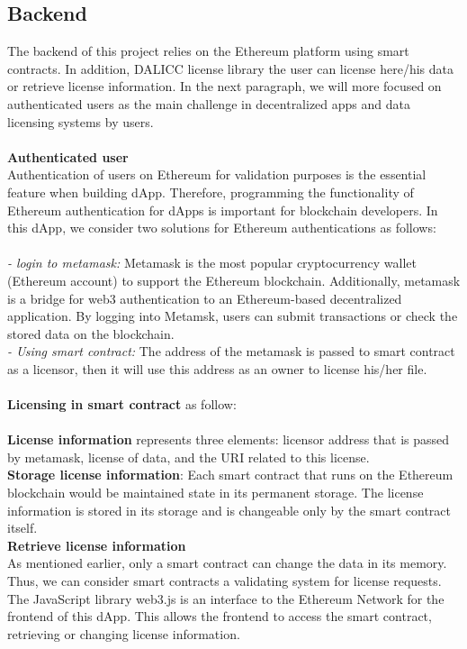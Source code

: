 \subsection{Backend} The backend of this project relies on the Ethereum platform using smart contracts. In addition, DALICC license library the user can license here/his data or retrieve license information. In the next paragraph, we will more focused on authenticated users as the main challenge in decentralized apps and data licensing systems by users. \\
\\
\textbf{Authenticated user} \\
Authentication of users on Ethereum for validation purposes is the essential feature when building dApp.  Therefore, programming the functionality of Ethereum authentication for dApps is important for blockchain developers. 
In this dApp, we consider two solutions for Ethereum authentications as follows: \\
\\
\textit{- login to metamask:} Metamask is the most popular cryptocurrency wallet (Ethereum account) to support the Ethereum blockchain. Additionally, metamask is a bridge for web3 authentication to an Ethereum-based decentralized application. By logging into Metamsk, users can submit transactions or check the stored data on the blockchain.\\
\textit{- Using smart contract: } The address of the metamask is passed to smart contract as a licensor, then it will
use this address as an owner to license his/her file. \\
\\
\textbf{Licensing in smart contract} as follow: \\
\\
\textbf{License information} represents three elements: licensor address that is passed by metamask, license of data, and the URI related to this license.\\
\textbf{Storage license information}: Each smart contract that runs on the Ethereum blockchain would be maintained state in its permanent storage. The license information is stored in its storage and is changeable only by the smart contract itself.\\
\textbf{Retrieve license information}\\
As mentioned earlier, only a smart contract can change the data in its memory. Thus, we can consider smart contracts a validating system for license requests. The JavaScript
library web3.js is an interface to the Ethereum Network for the frontend of this dApp. This allows the frontend to access the smart contract, retrieving or changing license information.\\

